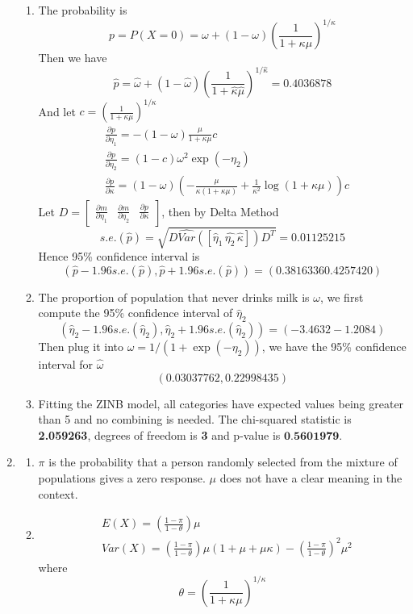 \documentclass{article}
\begin{document}
\begin{enumerate}[leftmargin = 0 em, label = \arabic*., font = \bfseries]
\begin{enumerate}
		    \item 
            The probability is
		   \[p = P(X = 0) = \omega + (1 - \omega)\left(\frac{1}{1 + \kappa \mu}\right)^{1/\kappa}\]
		   Then we have
		   \[\hat{p} = \hat{\omega} + (1 -\hat{\omega}) \left(\frac{1}{1 + \hat{\kappa} \hat{\mu}}\right)^{1/\hat{\kappa}} = 0.4036878  \]
		   And let $c = \left(\frac{1}{1 + \kappa \mu}\right)^{1/\kappa}$
		   \begin{align*}
		    &\frac{\partial p}{\partial \eta_1} = -(1 - \omega)\frac{\mu}{1 + \kappa \mu} c\\
		    & \frac{\partial p}{\partial \eta_2} = (1 - c)\omega^2 \exp(-\eta_2)\\
		    &\frac{\partial p}{\partial \kappa} = (1 - \omega)\left(-\frac{\mu}{\kappa(1 + \kappa \mu)} + \frac{1}{\kappa^2}\log(1 + \kappa \mu)\right)c
		    \end{align*}
		    Let $D = \begin{bmatrix}
		    	\frac{\partial m}{\partial \eta_1}&\frac{\partial m}{\partial \eta_2} & \frac{\partial p}{\partial \kappa}
		    \end{bmatrix}$, then by Delta Method
		    \[s.e.(\hat{p}) = \sqrt{D\widehat{Var}([\hat{\eta}_1\, \hat{\eta_2}\, \hat{\kappa}])D^T} =0.01125215\]
		    Hence 95\% confidence interval is
		    \[(\hat{p} - 1.96 s.e.(\hat{p}), \hat{p} + 1.96 s.e. (\hat{p})) = (0.3816336 0.4257420)\]

		    \item 
		    The proportion of population that never drinks milk is $\omega$, we first compute the 95\% confidence interval of $\hat{\eta}_2$
		    \[(\hat{\eta}_2 - 1.96 s.e.(\hat{\eta}_2) ,\hat{\eta}_2 + 1.96 s.e.(\hat{\eta}_2)) = (-3.4632 -1.2084)\]
		    Then plug it into $\omega = 1/(1 + \exp(-\eta_2))$, we have the 95\% confidence interval for $\hat{\omega}$
		    \[(0.03037762, 0.22998435)\]

		    \item 

		    Fitting the ZINB model, all categories have expected values being greater than 5 and no combining is needed. The chi-squared statistic is \textbf{2.059263},  degrees of freedom is \textbf{3} and p-value is $ \textbf{0.5601979}$. 


	\end{enumerate}

	\item 
	\begin{enumerate}
		\item 
		$\pi$ is the probability that a person randomly selected from the mixture of populations gives a zero response. $\mu$ does not have a clear meaning in the context.
		\item 
		\begin{align*}
		& E(X) = \left(\frac{1 - \pi}{1 - \theta}\right)\mu\\
		&Var(X) = \left(\frac{1 - \pi}{1 - \theta}\right)\mu(1 + \mu + \mu \kappa) - \left(\frac{1 - \pi}{1 - \theta}\right)^2 \mu^2
		\end{align*}
		where 
		\[\theta = \left(\frac{1}{1 + \kappa \mu}\right)^{1/ \kappa}\]


\end{enumerate}
\end{enumerate}
\end{document}
